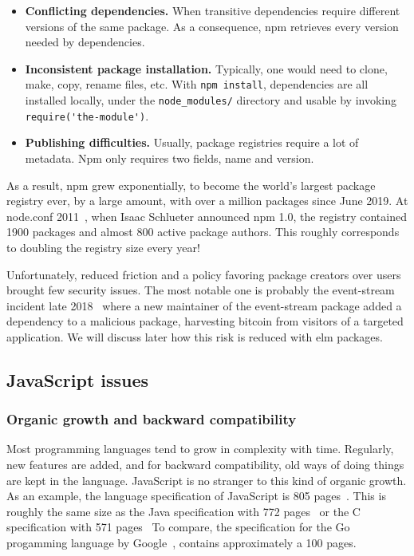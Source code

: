 \begin{itemize}
	\item \textbf{Conflicting dependencies.}
		When transitive dependencies require different versions of the same package.
		As a consequence, npm retrieves every version needed by dependencies.
	\item \textbf{Inconsistent package installation.}
		Typically, one would need to clone, make, copy, rename files, etc.
		With \verb|npm install|, dependencies are all installed locally,
		under the \verb|node_modules/| directory and usable by invoking
		\verb|require('the-module')|.
	\item \textbf{Publishing difficulties.}
		Usually, package registries require a lot of metadata.
		Npm only requires two fields, name and version.
\end{itemize}


As a result, npm grew exponentially, to become the world's largest package
registry ever, by a large amount, with over a million packages since June 2019.
At node.conf 2011~\cite{npm-video}, when Isaac Schlueter announced npm 1.0,
the registry contained 1900 packages and almost 800 active package authors.
This roughly corresponds to doubling the registry size every year!

Unfortunately, reduced friction and a policy favoring package creators over users
brought few security issues.
The most notable one is probably the event-stream incident late 2018~\cite{npm-event-stream}
where a new maintainer of the event-stream package added a dependency
to a malicious package, harvesting bitcoin from visitors of a targeted application.
We will discuss later how this risk is reduced with elm packages.


\subsection{JavaScript issues}%
\label{sub:javascript_issues}

\subsubsection{Organic growth and backward compatibility}%
\label{ssub:organic_growth_and_backward_compatibility}

Most programming languages tend to grow in complexity with time.
Regularly, new features are added, and for backward compatibility,
old ways of doing things are kept in the language.
JavaScript is no stranger to this kind of organic growth.
As an example, the language specification of JavaScript is 805 pages~\cite{ecmascript-pdf}.
This is roughly the same size as the Java specification with 772 pages~\cite{java-spec-pdf}
or the C specification with 571 pages~\cite{c-spec-pdf}
To compare, the specification for the Go progamming language
by Google~\cite{go-spec}, contains approximately a 100 pages.

